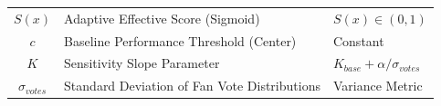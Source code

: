 \begin{table}[ht]
\begin{tabular}{cll}
        $S(x)$               & Adaptive Effective Score (Sigmoid)                 & $S(x) \in (0,1)$                                             \\
        $c$                  & Baseline Performance Threshold (Center)            & Constant                                                     \\
        $K$                  & Sensitivity Slope Parameter                        & $K_{base} + \alpha/\sigma_{votes}$                           \\
        $\sigma_{votes}$     & Standard Deviation of Fan Vote Distributions       & Variance Metric                                              \\
        \bottomrule
    \end{tabular}
    \label{table:variables}
\end{table}

